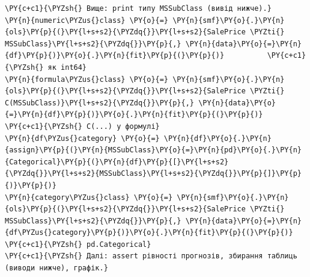 \begin{Verbatim}[commandchars=\\\{\}]
\PY{c+c1}{\PYZsh{} Вище: print типу MSSubClass (вивід нижче).}
\PY{n}{numeric\PYZus{}class} \PY{o}{=} \PY{n}{smf}\PY{o}{.}\PY{n}{ols}\PY{p}{(}\PY{l+s+s2}{\PYZdq{}}\PY{l+s+s2}{SalePrice \PYZti{} MSSubClass}\PY{l+s+s2}{\PYZdq{}}\PY{p}{,} \PY{n}{data}\PY{o}{=}\PY{n}{df}\PY{p}{)}\PY{o}{.}\PY{n}{fit}\PY{p}{(}\PY{p}{)}          \PY{c+c1}{\PYZsh{} як int64}
\PY{n}{formula\PYZus{}class} \PY{o}{=} \PY{n}{smf}\PY{o}{.}\PY{n}{ols}\PY{p}{(}\PY{l+s+s2}{\PYZdq{}}\PY{l+s+s2}{SalePrice \PYZti{} C(MSSubClass)}\PY{l+s+s2}{\PYZdq{}}\PY{p}{,} \PY{n}{data}\PY{o}{=}\PY{n}{df}\PY{p}{)}\PY{o}{.}\PY{n}{fit}\PY{p}{(}\PY{p}{)}       \PY{c+c1}{\PYZsh{} C(...) у формулі}
\PY{n}{df\PYZus{}category} \PY{o}{=} \PY{n}{df}\PY{o}{.}\PY{n}{assign}\PY{p}{(}\PY{n}{MSSubClass}\PY{o}{=}\PY{n}{pd}\PY{o}{.}\PY{n}{Categorical}\PY{p}{(}\PY{n}{df}\PY{p}{[}\PY{l+s+s2}{\PYZdq{}}\PY{l+s+s2}{MSSubClass}\PY{l+s+s2}{\PYZdq{}}\PY{p}{]}\PY{p}{)}\PY{p}{)}
\PY{n}{category\PYZus{}class} \PY{o}{=} \PY{n}{smf}\PY{o}{.}\PY{n}{ols}\PY{p}{(}\PY{l+s+s2}{\PYZdq{}}\PY{l+s+s2}{SalePrice \PYZti{} MSSubClass}\PY{l+s+s2}{\PYZdq{}}\PY{p}{,} \PY{n}{data}\PY{o}{=}\PY{n}{df\PYZus{}category}\PY{p}{)}\PY{o}{.}\PY{n}{fit}\PY{p}{(}\PY{p}{)}  \PY{c+c1}{\PYZsh{} pd.Categorical}
\PY{c+c1}{\PYZsh{} Далі: assert рівності прогнозів, збирання таблиць (виводи нижче), графік.}
\end{Verbatim}
